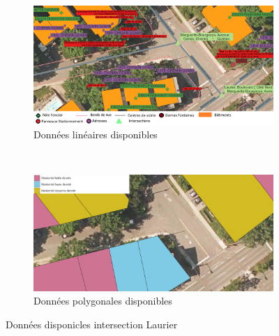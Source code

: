 \begin{figure}[ht]
  \centering
  \begin{subfigure}{\linewidth}
    \includegraphics[width=1.0\textwidth]{images/donnees_disponible_Laurier_legende_v2.png}
  \caption{Données linéaires disponibles}
  \label{fig:donnes_panneaux_Laurier}
  \end{subfigure} \\
  \begin{subfigure}{\linewidth}
    \includegraphics[width=1.0\textwidth]{images/utilisation_sols_Laurier_v2.png}
  \caption{Données polygonales disponibles}
  \label{fig:donnes_polygone_panneaux_Laurier}
  \end{subfigure}
  \caption{Données disponicles intersection Laurier}
\end{figure}

\FloatBarrier
